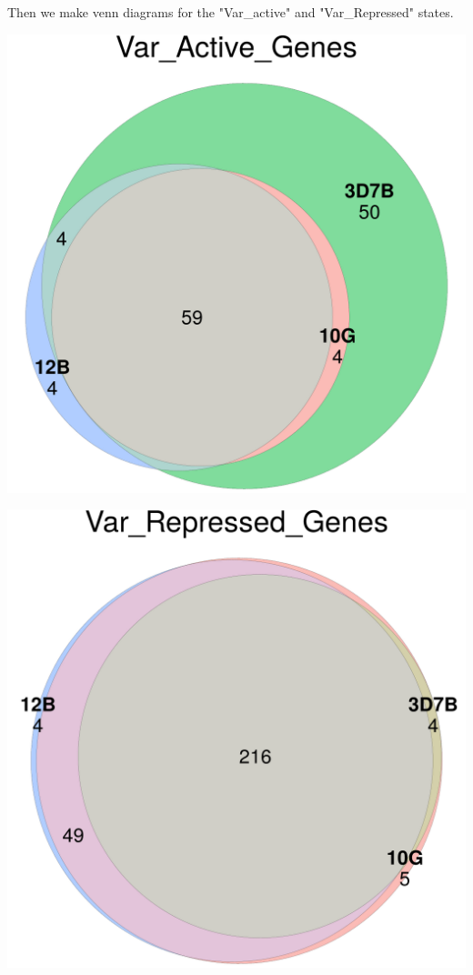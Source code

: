 \documentclass[11pt]{article}
\begin{document}
Then we make venn diagrams for the "Var\_active" and "Var\_Repressed" states.

\begin{center}
\includegraphics[width=.9\linewidth]{./Plots/venn_Var_Active_Genes.png}
\end{center}

\begin{center}
\includegraphics[width=.9\linewidth]{./Plots/venn_Var_Repressed_Genes.png}
\end{center}
\end{document}
